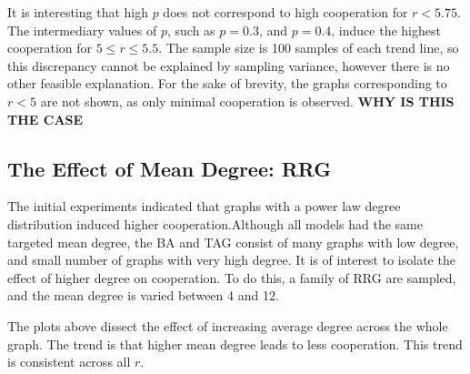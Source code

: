 It is interesting that high $p$ does not correspond to high cooperation for $r<5.75$. The intermediary values of $p$, such as $p=0.3$, and $p=0.4$, induce the highest cooperation for $5\leq r \leq 5.5$. The sample size is 100 samples of each trend line, so this discrepancy cannot be explained by sampling variance, however there is no other feasible explanation. For the sake of brevity, the graphs corresponding to $r<5$ are not shown, as only minimal cooperation is observed. \textbf{WHY IS THIS THE CASE} 


\subsection{The Effect of Mean Degree: RRG}
The initial experiments indicated that graphs with a power law degree distribution induced higher cooperation.Although all models had the same targeted mean degree, the BA and TAG consist of many graphs with low degree, and  small number of graphs with very high degree. It is of interest to isolate the effect of higher degree on cooperation. To do this, a family of RRG are sampled, and the mean degree is varied between 4 and 12. \\

 \FloatBarrier

 \FloatBarrier


The plots above dissect the effect of increasing average degree across the whole graph. The trend is that higher mean degree leads to less cooperation. This trend is consistent across all $r$. \\

